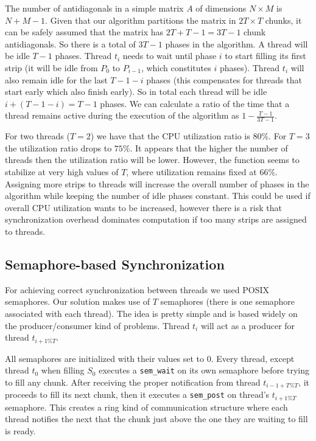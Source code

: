 \documentclass[journal]{IEEEtran}
\begin{document}
The number of antidiagonals in a simple matrix $A$ of dimensions $N \times M$ is $N + M - 1$. Given that our algorithm partitions the matrix in $2T \times T$ chunks, it can be safely assumed that the matrix has $2T + T - 1 = 3T - 1$ chunk antidiagonals. So there is a total of $3T - 1$ phases in the algorithm.  
A thread will be idle $T - 1$ phases. Thread $t_i$ needs to wait until phase $i$ to start filling its first strip (it will be idle from $P_0$ to $P_{i-1}$, which constitutes $i$ phases). Thread $t_i$ will also remain idle for the last $T - 1 - i$ phases (this compensates for threads that start early which also finish early). So in total each thread will be idle $i + (T - 1 - i) = T - 1$ phases. We can calculate a ratio of the time that a thread remains active during the execution of the algorithm as $1 - \frac{T-1}{3T-1}$.

For two threads ($T = 2$) we have that the CPU utilization ratio is 80\%. For $T = 3$ the utilization ratio drops to $75\%$. It appears that the higher the number of threads then the utilization ratio will be lower. However, the function seems to stabilize at very high values of $T$, where utilization remains fixed at $66\%$. Assigning more strips to threads will increase the overall number of phases in the algorithm while keeping the number of idle phases constant. This could be used if overall CPU utilization wants to be increased, however there is a risk that synchronization overhead dominates computation if too many strips are assigned to threads. 

\subsection{Semaphore-based Synchronization}

For achieving correct synchronization between threads we used POSIX semaphores. Our solution makes use of $T$ semaphores (there is one semaphore associated with each thread). The idea is pretty simple and is based widely on the producer/consumer kind of problems. Thread $t_i$ will act as a producer for thread $t_{i + 1 \% T}$. 

All semaphores are initialized with their values set to 0. Every thread, except thread $t_0$ when filling $S_0$ executes a {\tt sem\_wait} on its own semaphore before trying to fill any chunk. After receiving the proper notification from thread $t_{i-1+T \% T}$, it proceeds to fill its next chunk, then it executes a {\tt sem\_post} on thread's $t_{i + 1 \% T}$ semaphore. This creates a ring kind of communication structure where each thread notifies the next that the chunk just above the one they are waiting to fill is ready.
\end{document}
